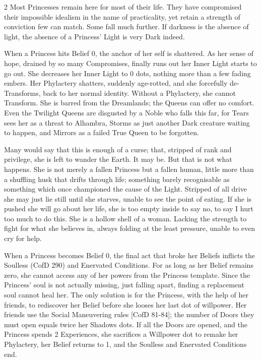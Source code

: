 \begin{multicols}{2}
Most Princesses remain here for most of their life. They have compromised their impossible idealism in the name of practicality, yet retain a strength of conviction few can match. Some fall much further. If darkness is the absence of light, the absence of a Princess' Light is very Dark indeed.

When a Princess hits Belief 0, the anchor of her self is shattered. As her sense of hope, drained by so many Compromises, finally runs out her Inner Light starts to go out. She decreases her Inner Light to 0 dots, nothing more than a few fading embers. Her Phylactery shatters, suddenly age-rotted, and she forcefully de-Transforms, back to her normal identity. Without a Phylactery, she cannot Transform. She is barred from the Dreamlands; the Queens can offer no comfort. Even the Twilight Queens are disgusted by a Noble who falls this far, for Tears sees her as a threat to Alhambra, Storms as just another Dark creature waiting to happen, and Mirrors as a failed True Queen to be forgotten.

Many would say that this is enough of a curse; that, stripped of rank and privilege, she is left to wander the Earth. It may be. But that is not what happens. She is not merely a fallen Princess but a fallen human, little more than a shuffling husk that drifts through life; something barely recognisable as something which once championed the cause of the Light. Stripped of all drive she may just lie still until she starves, unable to see the point of eating. If she is pushed she will go about her life, she is too empty inside to say no, to say I hurt too much to do this. She is a hollow shell of a woman. Lacking the strength to fight for what she believes in, always folding at the least pressure, unable to even cry for help. 

When a Princess becomes Belief 0, the final act that broke her Beliefs inflicts the Soulless (CofD 290) and Enervated Conditions. For as long as her Belief remains zero, she cannot access any of her powers from the Princess template. Since the Princess' soul is not actually missing, just falling apart, finding a replacement soul cannot heal her. The only solution is for the Princess, with the help of her friends, to rediscover her Belief before she looses her last dot of willpower. Her friends use the Social Maneuvering rules [CofD 81-84]; the number of Doors they must open equals twice her Shadows dots. If all the Doors are opened, and the Princess spends 2 Experiences, she sacrifices a Willpower dot to remake her Phylactery, her Belief returns to 1, and the Soulless and Enervated Conditions end.


\end{multicols}
